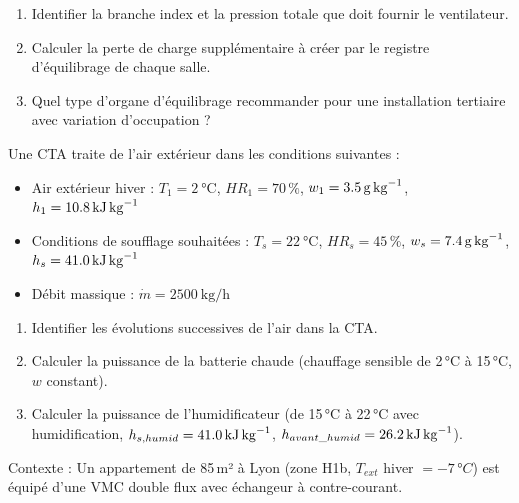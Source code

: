 \begin{enumerate}
  \item Identifier la branche index et la pression totale que doit fournir le ventilateur.
  \item Calculer la perte de charge supplémentaire à créer par le registre d'équilibrage de chaque salle.
  \item Quel type d'organe d'équilibrage recommander pour une installation tertiaire avec variation d'occupation ?
\end{enumerate}



Une CTA traite de l'air extérieur dans les conditions suivantes :
\begin{itemize}
  \item Air extérieur hiver : $T_1 = \SI{2}{\celsius}$, $HR_1 = 70\,\%$, $w_1 = \SI{3{,}5}{\gram\per\kilogram}$, $h_1 = \SI{10{,}8}{\kilo\joule\per\kilogram}$
  \item Conditions de soufflage souhaitées : $T_s = \SI{22}{\celsius}$, $HR_s = 45\,\%$, $w_s = \SI{7{,}4}{\gram\per\kilogram}$, $h_s = \SI{41{,}0}{\kilo\joule\per\kilogram}$
  \item Débit massique : $\dot{m} = \SI{2500}{\kilogram\per\hour}$
\end{itemize}

\begin{enumerate}
  \item Identifier les évolutions successives de l'air dans la CTA.
  \item Calculer la puissance de la batterie chaude (chauffage sensible de 2\,°C à 15\,°C, $w$ constant).
  \item Calculer la puissance de l'humidificateur (de 15\,°C à 22\,°C avec humidification, $h_{s,humid} = \SI{41{,}0}{\kilo\joule\per\kilogram}$, $h_{avant\_humid} = \SI{26{,}2}{\kilo\joule\per\kilogram}$).
\end{enumerate}



Contexte : Un appartement de 85\,m² à Lyon (zone H1b, $T_{ext}$ hiver $= -7\,°C$) est équipé d'une VMC double flux avec échangeur à contre-courant.

